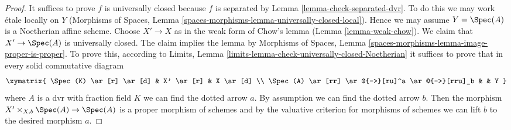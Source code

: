\begin{proof}
It suffices to prove $f$ is universally closed because $f$ is separated by
Lemma \ref{lemma-check-separated-dvr}.
To do this we may work \'etale locally on $Y$
(Morphisms of Spaces, Lemma
\ref{spaces-morphisms-lemma-universally-closed-local}).
Hence we may assume $Y = \Spec(A)$ is a Noetherian affine scheme.
Choose $X' \to X$ as in the weak form of Chow's lemma
(Lemma \ref{lemma-weak-chow}). We claim that $X' \to \Spec(A)$
is universally closed. The claim implies the lemma by
Morphisms of Spaces, Lemma \ref{spaces-morphisms-lemma-image-proper-is-proper}.
To prove this, according to
Limits, Lemma \ref{limits-lemma-check-universally-closed-Noetherian}
it suffices to prove that in every solid commutative diagram
$$
\xymatrix{
\Spec(K) \ar[r] \ar[d] & X' \ar[r] & X \ar[d] \\
\Spec(A) \ar[rr] \ar@{-->}[ru]^a \ar@{-->}[rru]_b & & Y
}
$$
where $A$ is a dvr with fraction field $K$ we can find the
dotted arrow $a$. By assumption we can find the dotted arrow $b$.
Then the morphism $X' \times_{X, b} \Spec(A) \to \Spec(A)$
is a proper morphism of schemes and by the valuative criterion
for morphisms of schemes we can lift $b$ to the desired morphism $a$.
\end{proof}

